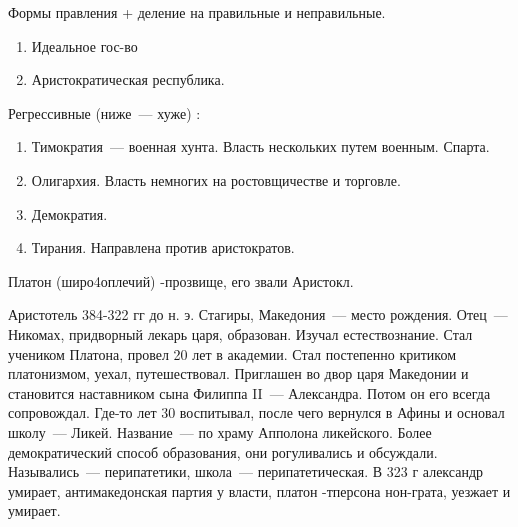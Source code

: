 Формы правления + деление на правильные и неправильные. 

\begin{enumerate}
	\item Идеальное гос-во
	\item Аристократическая республика.
\end{enumerate}

Регрессивные (ниже~--- хуже) :

\begin{enumerate}
	\item Тимократия~--- военная хунта. Власть нескольких путем военным. Спарта. 
	\item Олигархия. Власть немногих на ростовщичестве и торговле. 
	\item Демократия. 
	\item Тирания. Направлена против аристократов. 
\end{enumerate}

Платон (широ4оплечий) -прозвище, его звали Аристокл. 

Аристотель
384-322 гг до н. э. 
Стагиры, Македония~--- место рождения. Отец~--- Никомах, придворный лекарь царя, образован. 
Изучал естествознание. Стал учеником Платона, провел 20 лет в академии. Стал постепенно критиком платонизмом, уехал, путешествовал. Приглашен во двор царя Македонии и становится наставником сына Филиппа II~--- Александра. 
Потом он его всегда сопровождал. Где-то лет 30 воспитывал, после чего вернулся в Афины и основал школу~--- Ликей. 
Название~--- по храму Апполона ликейского. Более демократический способ образования, они рогуливались и обсуждали. 
Назывались~--- перипатетики, школа~--- перипатетическая. В 323 г александр умирает, антимакедонская партия у власти, платон -тперсона нон-грата, уезжает и умирает. 
 